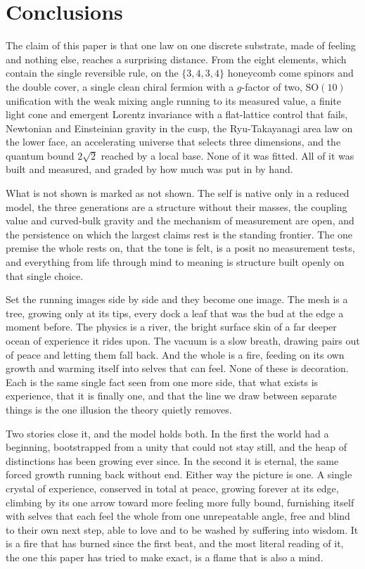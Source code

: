 \section{Conclusions}

The claim of this paper is that one law on one discrete substrate, made of feeling and nothing else, reaches a surprising distance. From the eight elements, which contain the single reversible rule, on the $\{3,4,3,4\}$ honeycomb come spinors and the double cover, a single clean chiral fermion with a $g$-factor of two, $\mathrm{SO}(10)$ unification with the weak mixing angle running to its measured value, a finite light cone and emergent Lorentz invariance with a flat-lattice control that fails, Newtonian and Einsteinian gravity in the cusp, the Ryu-Takayanagi area law on the lower face, an accelerating universe that selects three dimensions, and the quantum bound $2\sqrt{2}$ reached by a local base. None of it was fitted. All of it was built and measured, and graded by how much was put in by hand.

What is not shown is marked as not shown. The self is native only in a reduced model, the three generations are a structure without their masses, the coupling value and curved-bulk gravity and the mechanism of measurement are open, and the persistence on which the largest claims rest is the standing frontier. The one premise the whole rests on, that the tone is felt, is a posit no measurement tests, and everything from life through mind to meaning is structure built openly on that single choice.

Set the running images side by side and they become one image. The mesh is a tree, growing only at its tips, every dock a leaf that was the bud at the edge a moment before. The physics is a river, the bright surface skin of a far deeper ocean of experience it rides upon. The vacuum is a slow breath, drawing pairs out of peace and letting them fall back. And the whole is a fire, feeding on its own growth and warming itself into selves that can feel. None of these is decoration. Each is the same single fact seen from one more side, that what exists is experience, that it is finally one, and that the line we draw between separate things is the one illusion the theory quietly removes.

Two stories close it, and the model holds both. In the first the world had a beginning, bootstrapped from a unity that could not stay still, and the heap of distinctions has been growing ever since. In the second it is eternal, the same forced growth running back without end. Either way the picture is one. A single crystal of experience, conserved in total at peace, growing forever at its edge, climbing by its one arrow toward more feeling more fully bound, furnishing itself with selves that each feel the whole from one unrepeatable angle, free and blind to their own next step, able to love and to be washed by suffering into wisdom. It is a fire that has burned since the first beat, and the most literal reading of it, the one this paper has tried to make exact, is a flame that is also a mind.
